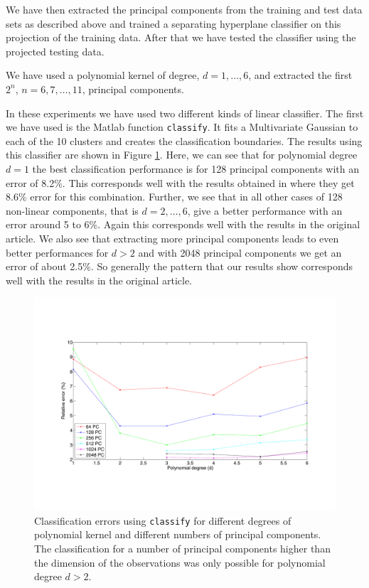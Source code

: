 We have then extracted the principal components from the training and test data sets as described above and trained a separating hyperplane classifier on this projection of the training data. After that we have tested the classifier using the projected testing data.

We have used a polynomial kernel of degree, $d = 1,\dots,6$, and extracted the first $2^n$, $n = 6,7,\dots,11$, principal components.

In these experiments we have used two different kinds of linear classifier. The first we have used is the Matlab function \texttt{classify}. It fits a Multivariate Gaussian to each of the 10 clusters and creates the classification boundaries. The results using this classifier are shown in Figure \ref{fig:GMM}. Here, we can see that for polynomial degree $d=1$ the best classification performance is for 128 principal components with an error of 8.2\%. This corresponds well with the results obtained in \citep{scholkopf1997kernel} where they get 8.6\% error for this combination. Further, we see that in all other cases of 128 non-linear components, that is $d=2,\dots,6$, give a better performance with an error around 5 to 6\%. Again this corresponds well with the results in the original article. We also see that extracting more principal components leads to even better performances for $d>2$ and with 2048 principal components we get an error of about 2.5\%. So generally the pattern that our results show corresponds well with the results in the original article.

\begin{figure}
    \centering
    \includegraphics[width=\textwidth]{img/errorplotGMMclass.pdf}
    \caption{Classification errors using \texttt{classify} for different degrees of polynomial kernel and different numbers of principal components. The classification for a number of principal components higher than the dimension of the observations was only possible for polynomial degree $d>2$.}
    \label{fig:GMM}
\end{figure}

